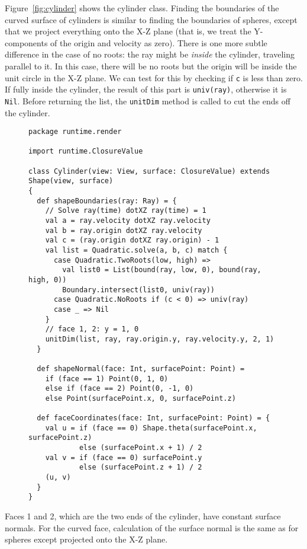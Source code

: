 Figure~\ref{fig:cylinder} shows the cylinder class.
Finding the boundaries of the curved surface of cylinders is similar to
finding the boundaries of spheres,
except that we project everything onto the X-Z plane
(that is, we treat the Y-components of the origin and velocity as zero).
There is one more subtle difference in the case of no roots:
the ray might be \emph{inside} the cylinder,
traveling parallel to it.
In this case, there will be no roots but the origin will be inside the
unit circle in the X-Z plane.
We can test for this by checking if \verb!c! is less than zero.
If fully inside the cylinder, the result of this part is \verb!univ(ray)!,
otherwise it is \verb!Nil!.
Before returning the list,
the \verb!unitDim! method is called to cut the ends off the cylinder.

\begin{figure}
\begin{verbatim}
package runtime.render

import runtime.ClosureValue

class Cylinder(view: View, surface: ClosureValue) extends Shape(view, surface)
{
  def shapeBoundaries(ray: Ray) = {
    // Solve ray(time) dotXZ ray(time) = 1
    val a = ray.velocity dotXZ ray.velocity
    val b = ray.origin dotXZ ray.velocity
    val c = (ray.origin dotXZ ray.origin) - 1
    val list = Quadratic.solve(a, b, c) match {
      case Quadratic.TwoRoots(low, high) =>
        val list0 = List(bound(ray, low, 0), bound(ray, high, 0))
        Boundary.intersect(list0, univ(ray))
      case Quadratic.NoRoots if (c < 0) => univ(ray)
      case _ => Nil
    }
    // face 1, 2: y = 1, 0
    unitDim(list, ray, ray.origin.y, ray.velocity.y, 2, 1)
  }

  def shapeNormal(face: Int, surfacePoint: Point) =
    if (face == 1) Point(0, 1, 0)
    else if (face == 2) Point(0, -1, 0)
    else Point(surfacePoint.x, 0, surfacePoint.z)

  def faceCoordinates(face: Int, surfacePoint: Point) = {
    val u = if (face == 0) Shape.theta(surfacePoint.x, surfacePoint.z)
            else (surfacePoint.x + 1) / 2
    val v = if (face == 0) surfacePoint.y
            else (surfacePoint.z + 1) / 2
    (u, v)
  }
}
\end{verbatim}
\getcaption
\end{figure}

Faces 1 and 2, which are the two ends of the cylinder,
have constant surface normals.
For the curved face,
calculation of the surface normal is the same as for spheres
except projected onto the X-Z plane.

